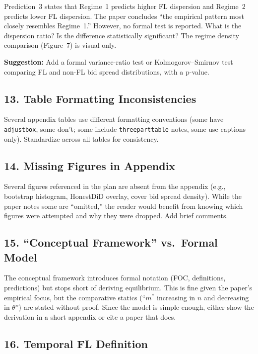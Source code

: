 \documentclass[12pt]{article}
\begin{document}
Prediction~3 states that Regime~1 predicts higher FL dispersion and
Regime~2 predicts lower FL dispersion. The paper concludes ``the
empirical pattern most closely resembles Regime~1.'' However, no formal
test is reported. What is the dispersion ratio? Is the difference
statistically significant? The regime density comparison (Figure~7) is
visual only.

\noindent\textbf{Suggestion:} Add a formal variance-ratio test or
Kolmogorov--Smirnov test comparing FL and non-FL bid spread
distributions, with a p-value.

\subsection*{13. Table Formatting Inconsistencies}

Several appendix tables use different formatting conventions (some have
\texttt{adjustbox}, some don't; some include \texttt{threeparttable}
notes, some use captions only). Standardize across all tables for
consistency.

\subsection*{14. Missing Figures in Appendix}

Several figures referenced in the plan are absent from the appendix
(e.g., bootstrap histogram, HonestDiD overlay, cover bid spread
density). While the paper notes some are ``omitted,'' the reader would
benefit from knowing which figures were attempted and why they were
dropped. Add brief comments.

\subsection*{15. ``Conceptual Framework'' vs.\ Formal Model}

The conceptual framework introduces formal notation (FOC, definitions,
predictions) but stops short of deriving equilibrium. This is fine given
the paper's empirical focus, but the comparative statics (``$m^*$
increasing in $n$ and decreasing in $\theta$'') are stated without
proof. Since the model is simple enough, either show the derivation in
a short appendix or cite a paper that does.

\subsection*{16. Temporal FL Definition}
\end{document}
